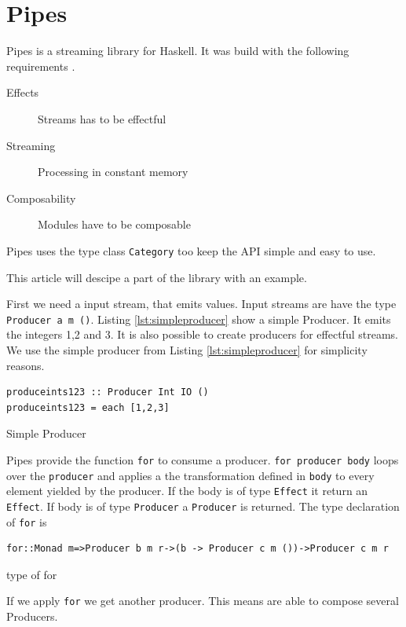 \documentclass[twoside, a4paper]{article}
\begin{document}
\section{Pipes}
\label{sec:pipes}

Pipes is a streaming library for Haskell. It was build with the following requirements \cite{gonzales13}.
\begin{description}
\item[Effects] Streams has to be effectful
\item[Streaming] Processing in constant memory
\item[Composability] Modules have to be composable
\end{description}

Pipes uses the type class \verb|Category| too keep the API simple and easy to use.

This article will descipe a part of the library with an example.

First we need a input stream, that emits values. Input streams are have the type 
\verb|Producer a m ()|.
Listing \ref{lst:simpleproducer} show a simple Producer. It emits the integers 1,2 and 3. It is also possible to create producers for effectful streams. We use the simple producer from Listing \ref{lst:simpleproducer} for simplicity reasons.

\begin{program}
\begin{verbatim}
produceints123 :: Producer Int IO ()
produceints123 = each [1,2,3]
\end{verbatim}
\caption{Simple Producer}
\label{lst:simpleproducer}
\end{program}

Pipes provide the function \verb|for| to consume a producer. 
\verb|for producer body| loops over the \verb|producer| and applies a the transformation defined in \verb|body| to every element yielded by the producer. If the body is of type \verb|Effect| it return an \verb|Effect|. If body is of type \verb|Producer| a \verb|Producer| is returned. The type declaration of \verb|for| is
\begin{program}
\begin{verbatim}
for::Monad m=>Producer b m r->(b -> Producer c m ())->Producer c m r
\end{verbatim}
\caption{type of for}
\end{program}

If we apply \verb|for| we get another producer. This means are able to compose several Producers.
\end{document}

